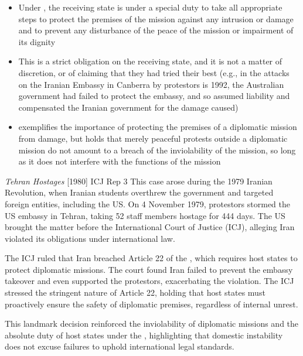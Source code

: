 \begin{itemize}
    \item Under , the receiving state is under a special duty to take all appropriate steps to protect the premises of the mission against any intrusion or damage and to prevent any disturbance of the peace of the mission or impairment of its dignity
    \item This is a strict obligation on the receiving state, and it is not a matter of discretion, or of claiming that they had tried their best (e.g., in the attacks on the Iranian Embassy in Canberra by protestors is 1992, the Australian government had failed to protect the embassy, and so assumed liability and compensated the Iranian government for the damage caused)
    \item {} exemplifies the importance of protecting the premises of a diplomatic mission from damage, but  holds that merely peaceful protests outside a diplomatic mission do not amount to a breach of the inviolability of the mission, so long as it does not interfere with the functions of the mission
\end{itemize}

\begin{casedetails}{\textit{Tehran Hostages} [1980] ICJ Rep 3}
    \flushleft
    This case arose during the 1979 Iranian Revolution, when Iranian students overthrew the government and targeted foreign entities, including the US. On 4 November 1979, protestors stormed the US embassy in Tehran, taking 52 staff members hostage for 444 days. The US brought the matter before the International Court of Justice (ICJ), alleging Iran violated its obligations under international law.

    \vspace{\baselineskip}

    The ICJ ruled that Iran breached Article 22 of the , which requires host states to protect diplomatic missions. The court found Iran failed to prevent the embassy takeover and even supported the protestors, exacerbating the violation. The ICJ stressed the stringent nature of Article 22, holding that host states must proactively ensure the safety of diplomatic premises, regardless of internal unrest.
    
    \vspace{\baselineskip}

    This landmark decision reinforced the inviolability of diplomatic missions and the absolute duty of host states under the , highlighting that domestic instability does not excuse failures to uphold international legal standards.
\end{casedetails}

